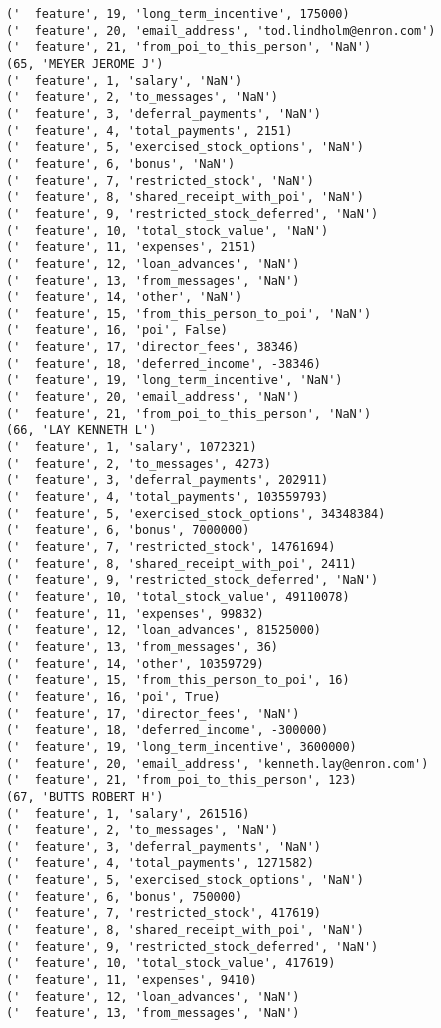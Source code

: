 \begin{verbatim}
('  feature', 19, 'long_term_incentive', 175000)
('  feature', 20, 'email_address', 'tod.lindholm@enron.com')
('  feature', 21, 'from_poi_to_this_person', 'NaN')
(65, 'MEYER JEROME J')
('  feature', 1, 'salary', 'NaN')
('  feature', 2, 'to_messages', 'NaN')
('  feature', 3, 'deferral_payments', 'NaN')
('  feature', 4, 'total_payments', 2151)
('  feature', 5, 'exercised_stock_options', 'NaN')
('  feature', 6, 'bonus', 'NaN')
('  feature', 7, 'restricted_stock', 'NaN')
('  feature', 8, 'shared_receipt_with_poi', 'NaN')
('  feature', 9, 'restricted_stock_deferred', 'NaN')
('  feature', 10, 'total_stock_value', 'NaN')
('  feature', 11, 'expenses', 2151)
('  feature', 12, 'loan_advances', 'NaN')
('  feature', 13, 'from_messages', 'NaN')
('  feature', 14, 'other', 'NaN')
('  feature', 15, 'from_this_person_to_poi', 'NaN')
('  feature', 16, 'poi', False)
('  feature', 17, 'director_fees', 38346)
('  feature', 18, 'deferred_income', -38346)
('  feature', 19, 'long_term_incentive', 'NaN')
('  feature', 20, 'email_address', 'NaN')
('  feature', 21, 'from_poi_to_this_person', 'NaN')
(66, 'LAY KENNETH L')
('  feature', 1, 'salary', 1072321)
('  feature', 2, 'to_messages', 4273)
('  feature', 3, 'deferral_payments', 202911)
('  feature', 4, 'total_payments', 103559793)
('  feature', 5, 'exercised_stock_options', 34348384)
('  feature', 6, 'bonus', 7000000)
('  feature', 7, 'restricted_stock', 14761694)
('  feature', 8, 'shared_receipt_with_poi', 2411)
('  feature', 9, 'restricted_stock_deferred', 'NaN')
('  feature', 10, 'total_stock_value', 49110078)
('  feature', 11, 'expenses', 99832)
('  feature', 12, 'loan_advances', 81525000)
('  feature', 13, 'from_messages', 36)
('  feature', 14, 'other', 10359729)
('  feature', 15, 'from_this_person_to_poi', 16)
('  feature', 16, 'poi', True)
('  feature', 17, 'director_fees', 'NaN')
('  feature', 18, 'deferred_income', -300000)
('  feature', 19, 'long_term_incentive', 3600000)
('  feature', 20, 'email_address', 'kenneth.lay@enron.com')
('  feature', 21, 'from_poi_to_this_person', 123)
(67, 'BUTTS ROBERT H')
('  feature', 1, 'salary', 261516)
('  feature', 2, 'to_messages', 'NaN')
('  feature', 3, 'deferral_payments', 'NaN')
('  feature', 4, 'total_payments', 1271582)
('  feature', 5, 'exercised_stock_options', 'NaN')
('  feature', 6, 'bonus', 750000)
('  feature', 7, 'restricted_stock', 417619)
('  feature', 8, 'shared_receipt_with_poi', 'NaN')
('  feature', 9, 'restricted_stock_deferred', 'NaN')
('  feature', 10, 'total_stock_value', 417619)
('  feature', 11, 'expenses', 9410)
('  feature', 12, 'loan_advances', 'NaN')
('  feature', 13, 'from_messages', 'NaN')

\end{verbatim}

